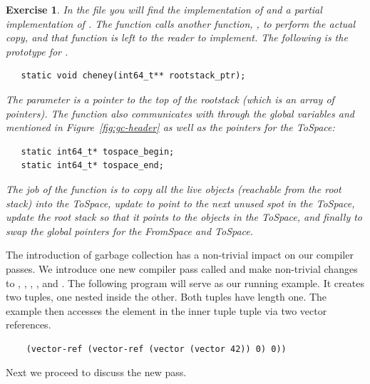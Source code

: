 \documentclass[11pt]{book}
\newtheorem{exercise}[theorem]{Exercise}
\begin{document}
\begin{exercise}
  In the file  you will find the implementation of
   and a partial implementation of .
  The  function calls another function, ,
  to perform the actual copy, and that function is left to the reader
  to implement. The following is the prototype for .
\begin{lstlisting}
   static void cheney(int64_t** rootstack_ptr);
\end{lstlisting}
  The parameter  is a pointer to the top of the
  rootstack (which is an array of pointers).  The  function
  also communicates with  through the global
  variables  and 
  mentioned in Figure~\ref{fig:gc-header} as well as the pointers for
  the ToSpace:
\begin{lstlisting}
   static int64_t* tospace_begin;
   static int64_t* tospace_end;
\end{lstlisting}
  The job of the  function is to copy all the live
  objects (reachable from the root stack) into the ToSpace, update
   to point to the next unused spot in the ToSpace,
  update the root stack so that it points to the objects in the
  ToSpace, and finally to swap the global pointers for the FromSpace
  and ToSpace.
\end{exercise}



The introduction of garbage collection has a non-trivial impact on our
compiler passes. We introduce one new compiler pass called
 and make non-trivial changes to
, , ,
, and .  The following
program will serve as our running example.  It creates two tuples, one
nested inside the other. Both tuples have length one. The example then
accesses the element in the inner tuple tuple via two vector
references.
\begin{lstlisting}
    (vector-ref (vector-ref (vector (vector 42)) 0) 0))
\end{lstlisting}

Next we proceed to discuss the new  pass.
\end{document}
